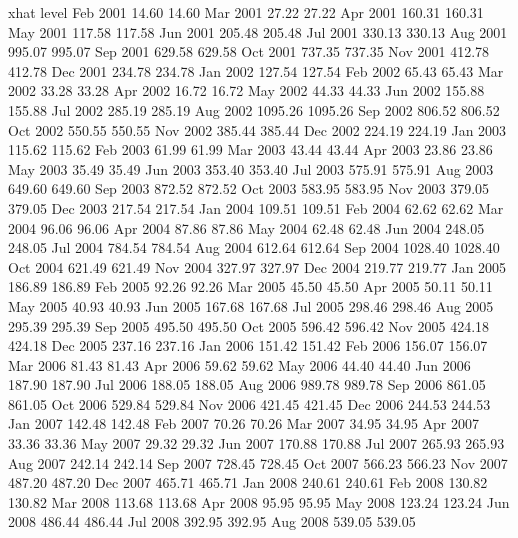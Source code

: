\begin{center}
\begin{Schunk}
\begin{Soutput}
            xhat   level
Feb 2001   14.60   14.60
Mar 2001   27.22   27.22
Apr 2001  160.31  160.31
May 2001  117.58  117.58
Jun 2001  205.48  205.48
Jul 2001  330.13  330.13
Aug 2001  995.07  995.07
Sep 2001  629.58  629.58
Oct 2001  737.35  737.35
Nov 2001  412.78  412.78
Dec 2001  234.78  234.78
Jan 2002  127.54  127.54
Feb 2002   65.43   65.43
Mar 2002   33.28   33.28
Apr 2002   16.72   16.72
May 2002   44.33   44.33
Jun 2002  155.88  155.88
Jul 2002  285.19  285.19
Aug 2002 1095.26 1095.26
Sep 2002  806.52  806.52
Oct 2002  550.55  550.55
Nov 2002  385.44  385.44
Dec 2002  224.19  224.19
Jan 2003  115.62  115.62
Feb 2003   61.99   61.99
Mar 2003   43.44   43.44
Apr 2003   23.86   23.86
May 2003   35.49   35.49
Jun 2003  353.40  353.40
Jul 2003  575.91  575.91
Aug 2003  649.60  649.60
Sep 2003  872.52  872.52
Oct 2003  583.95  583.95
Nov 2003  379.05  379.05
Dec 2003  217.54  217.54
Jan 2004  109.51  109.51
Feb 2004   62.62   62.62
Mar 2004   96.06   96.06
Apr 2004   87.86   87.86
May 2004   62.48   62.48
Jun 2004  248.05  248.05
Jul 2004  784.54  784.54
Aug 2004  612.64  612.64
Sep 2004 1028.40 1028.40
Oct 2004  621.49  621.49
Nov 2004  327.97  327.97
Dec 2004  219.77  219.77
Jan 2005  186.89  186.89
Feb 2005   92.26   92.26
Mar 2005   45.50   45.50
Apr 2005   50.11   50.11
May 2005   40.93   40.93
Jun 2005  167.68  167.68
Jul 2005  298.46  298.46
Aug 2005  295.39  295.39
Sep 2005  495.50  495.50
Oct 2005  596.42  596.42
Nov 2005  424.18  424.18
Dec 2005  237.16  237.16
Jan 2006  151.42  151.42
Feb 2006  156.07  156.07
Mar 2006   81.43   81.43
Apr 2006   59.62   59.62
May 2006   44.40   44.40
Jun 2006  187.90  187.90
Jul 2006  188.05  188.05
Aug 2006  989.78  989.78
Sep 2006  861.05  861.05
Oct 2006  529.84  529.84
Nov 2006  421.45  421.45
Dec 2006  244.53  244.53
Jan 2007  142.48  142.48
Feb 2007   70.26   70.26
Mar 2007   34.95   34.95
Apr 2007   33.36   33.36
May 2007   29.32   29.32
Jun 2007  170.88  170.88
Jul 2007  265.93  265.93
Aug 2007  242.14  242.14
Sep 2007  728.45  728.45
Oct 2007  566.23  566.23
Nov 2007  487.20  487.20
Dec 2007  465.71  465.71
Jan 2008  240.61  240.61
Feb 2008  130.82  130.82
Mar 2008  113.68  113.68
Apr 2008   95.95   95.95
May 2008  123.24  123.24
Jun 2008  486.44  486.44
Jul 2008  392.95  392.95
Aug 2008  539.05  539.05

\end{Soutput}
\end{Schunk}
\end{center}
